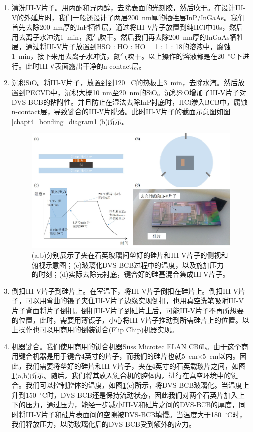 \begin{enumerate}[(1)]
	\item 清洗III-V片子。用丙酮和异丙醇，去除表面的光刻胶，然后吹干。在设计III-V的外延片时，我们一般还设计了两层200~nm厚的牺牲层InP/InGaAs。我们首先去除200~nm厚的InP牺牲层，通过将III-V片子放置到纯HCl中10s，然后用去离子水冲洗1~min，氮气吹干。然后我们再去除200~nm厚的InGaAs牺牲层，通过将III-V片子放置到HSO : HO : HO = 1 : 1 : 18的溶液中，腐蚀1~min，接下来用去离子水冲洗，氮气吹干。以上操作的溶液都是在20~$^{\circ}$C下进行。此时III-V表面露出干净的n-contact层。
	\item 沉积SiO。将III-V片子，放置到到120~$^{\circ}$C的热板上3~min，去除水汽。然后放置到PECVD中，沉积大概10~nm至20~nm的SiO。沉积SiO增加了III-V片子对DVS-BCB的粘附性。并且防止在湿法去除InP衬底时，HCl渗入BCB中，腐蚀n-contact层，导致键合的III-V片脱落。此时III-V片子的截面示意图如图\ref{chapt4_bonding_diagram1}(b)所示。
	\begin{figure}[htb]
		\centering
		\includegraphics[width=14cm]{./Pictures/chapt4_bonding_diagram2.jpg}
		\caption{(a,b)分别展示了夹在石英玻璃间垒好的硅片和III-V片子的侧视和俯视示意图；(c)玻璃化DVS-BCB过程中的温度，以及施加压力的时刻；(d)实际去除完衬底，键合好的硅基混合集成III-V片子。}
		\label{chapt4_bonding_diagram2}
	\end{figure}
	\item 倒扣III-V片子到硅片上。在室温下，将III-V片子倒扣在硅片上。倒扣III-V片子，可以用弯曲的镊子夹住III-V片子边缘实现倒扣，也用真空洗笔吸附III-V片子背面将片子倒扣。倒扣III-V片子到硅片上后，可能III-V片子不再所想要的位置，此时，需要用薄镊子，小心将III-V片子推动到所需硅片上的位置。以上操作也可以用商用的倒装键合(Flip Chip)机器实现。
	\item 机器键合。我们使用商用的键合机器S{\"u}ss Microtec ELAN CB6L。由于这个商用键合机器是用于键合4英寸的片子，而我们的硅片也就5~cm$\times$5~cm以内。因此，我们需要将垒好的硅片和III-V片子，夹在4英寸的石英载玻片之间，如图\ref{chapt4_bonding_diagram2}(a,b)所示。随后，我们将其放入键合机的腔体内，进行在真空环境中的键合。我们可以控制腔体的温度，如图\ref{chapt4_bonding_diagram2}(c)所示，将DVS-BCB玻璃化。当温度上升到150~$^{\circ}$C时，DVS-BCB还是保持流动状态，因此我们对两个石英片加入上下的压力，通过压力，能经一步减小III-V和硅片之间的DVS-BCB的厚度，同时将III-V片子和硅片表面间的空隙被DVS-BCB填慢。当温度大于180~$^{\circ}$C时，我们释放压力，以防玻璃化后的DVS-BCB受到额外的应力。

\end{enumerate}
